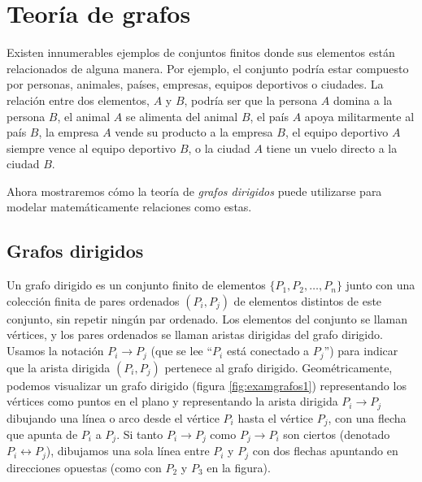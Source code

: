 \newpage

\section{Teoría de grafos}

Existen innumerables ejemplos de conjuntos finitos donde sus elementos están relacionados de alguna manera. Por ejemplo, el conjunto podría estar compuesto por personas, animales, países, empresas, equipos deportivos o ciudades. La relación entre dos elementos, $A$ y $B$, podría ser que la persona $A$ domina a la persona $B$, el animal $A$ se alimenta del animal $B$, el país $A$ apoya militarmente al país $B$, la empresa $A$ vende su producto a la empresa $B$, el equipo deportivo $A$ siempre vence al equipo deportivo $B$, o la ciudad $A$ tiene un vuelo directo a la ciudad $B$.

Ahora mostraremos cómo la teoría de \emph{grafos dirigidos} puede utilizarse para modelar matemáticamente relaciones como estas.

\subsection*{Grafos dirigidos}

Un grafo dirigido es un conjunto finito de elementos $\{P_1, P_2, \dots, P_n\}$ junto con una colección finita de pares ordenados $(P_i, P_j)$ de elementos distintos de este conjunto, sin repetir ningún par ordenado. Los elementos del conjunto se llaman vértices, y los pares ordenados se llaman aristas dirigidas del grafo dirigido. Usamos la notación $P_i \rightarrow P_j$ (que se lee “$P_i$ está conectado a $P_j$”) para indicar que la arista dirigida $(P_i, P_j)$ pertenece al grafo dirigido. Geométricamente, podemos visualizar un grafo dirigido (figura \ref{fig:examgrafos1}) representando los vértices como puntos en el plano y representando la arista dirigida $P_i \rightarrow P_j$ dibujando una línea o arco desde el vértice $P_i$ hasta el vértice $P_j$, con una flecha que apunta de $P_i$ a $P_j$. Si tanto $P_i \rightarrow P_j$ como $P_j \rightarrow P_i$ son ciertos (denotado $P_i \leftrightarrow P_j$), dibujamos una sola línea entre $P_i$ y $P_j$ con dos flechas apuntando en direcciones opuestas (como con $P_2$ y $P_3$ en la figura).

